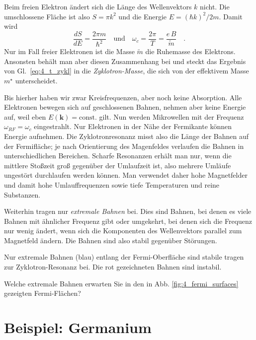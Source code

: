 Beim freien Elektron ändert sich die Länge des Wellenvektors $k$ nicht. Die umschlossene Fläche ist also $S = \pi k^2$ und die Energie $E = (\hbar k)^2 / 2m$. Damit wird 
\begin{equation}
   \frac{dS}{dE} = \frac{2 \pi m}{\hbar^2} \quad \text{und} \quad  \omega_c = \frac{2\pi}{T} =  \frac{e \, B }{\tilde{m}}  \quad .
 \end{equation}
Nur im Fall freier Elektronen ist die Masse $\tilde{m}$ die Ruhemasse des Elektrons. Ansonsten behält man aber diesen Zusammenhang bei und steckt das Ergebnis von Gl.~\ref{eq:4_t_zykl} in die 
 \emph{Zyklotron-Masse}, die sich von der effektivem Masse $m^\star$ unterscheidet.

 Bis hierher haben wir zwar Kreisfrequenzen, aber noch keine Absorption. Alle Elektronen bewegen sich auf geschlossenen Bahnen, nehmen aber keine Energie auf, weil eben $E (\mathbf{k}) = \text{const.}$ gilt. Nun werden Mikrowellen mit der Frequenz $\omega_{RF} = \omega_c$ eingestrahlt. Nur Elektronen in der Nähe der Fermikante können Energie aufnehmen. Die Zyklotronresonanz misst also die Länge der Bahnen auf der Fermifläche; je nach Orientierung des Magenfeldes verlaufen die Bahnen in unterschiedlichen Bereichen. Scharfe Resonanzen erhält man nur, wenn die mittlere Stoßzeit groß gegenüber der Umlaufzeit ist, also mehrere Umläufe ungestört durchlaufen werden können. Man verwendet daher hohe Magnetfelder und damit hohe Umlauffrequenzen sowie tiefe Temperaturen und reine Substanzen.

Weiterhin tragen nur \emph{extremale Bahnen} bei. Dies sind Bahnen, bei denen es viele Bahnen mit ähnlicher Frequenz gibt oder umgekehrt, bei denen sich die Frequenz nur wenig ändert, wenn sich die Komponenten des Wellenvektors parallel zum Magnetfeld ändern. Die Bahnen sind also stabil gegenüber Störungen.

\begin{marginfigure}
   \caption{Nur extremale Bahnen (blau) entlang der Fermi-Oberfläche sind stabile tragen zur Zyklotron-Resonanz bei. Die rot gezeichneten Bahnen sind instabil.}
\end{marginfigure}
 

\begin{questions}
   \item Welche extremale Bahnen erwarten Sie in den in Abb.  \ref{fig:4_fermi_surfaces} gezeigten Fermi-Flächen?  
\end{questions}

\section{Beispiel: Germanium}


